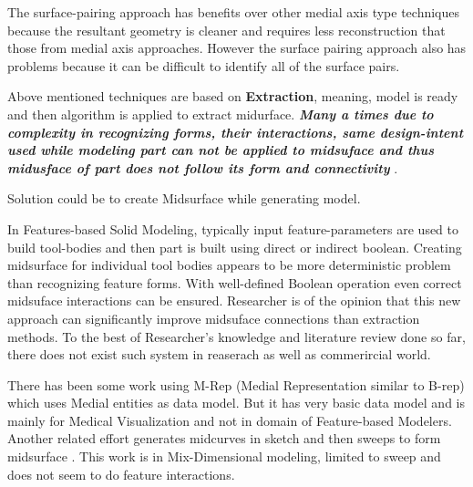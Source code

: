 \documentclass[a4paper]{article}
\begin{document}


The surface-pairing approach has benefits over other medial axis type techniques because the resultant geometry is cleaner and requires less reconstruction that those from medial axis approaches. However the surface pairing approach also has problems because it can be difficult to identify all of the surface pairs. 


Above mentioned techniques are based on \textbf{Extraction}, meaning, model is ready and then algorithm is applied  to extract midurface. \textbf{\textsl{Many a times due to complexity in recognizing forms, their interactions, same design-intent used while modeling part can not be applied to midsuface and thus midusface of part does not follow its form and connectivity}}\cite{Jxcad,Sheen2008} .


Solution could be to create Midsurface while generating model.

In Features-based Solid Modeling, typically input feature-parameters are used to build tool-bodies and then part is built using direct or indirect boolean. Creating midsurface for individual tool bodies appears to be more deterministic problem than recognizing feature forms. With well-defined Boolean operation even correct midsuface interactions can be ensured. Researcher is of the opinion that this new approach can significantly improve midsuface connections than extraction methods. To the best of Researcher's knowledge and literature review done so far, there does not exist such system in reaserach as well as commerircial world.

There has been some work using M-Rep (Medial Representation similar to B-rep) which uses Medial entities as data model. But it has very basic data model and is mainly for Medical Visualization and not in domain of Feature-based Modelers\cite{Fletcher2004}. Another related effort generates midcurves in sketch and then sweeps to form midsurface \cite{Robinson2006}. This work is in Mix-Dimensional modeling, limited to sweep and does not seem to do feature interactions. 
\end{document}
